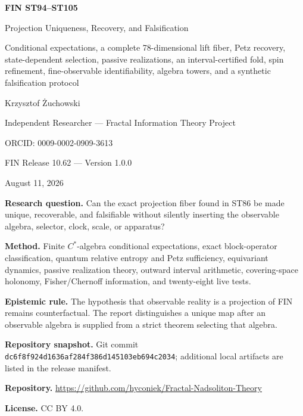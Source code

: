 \documentclass[11pt,a4paper]{article}
\begin{document}
\begin{titlepage}
\centering
\vspace*{1.1cm}
{\LARGE\bfseries FIN ST94--ST105\par}
\vspace{0.35cm}
{\Large Projection Uniqueness, Recovery, and Falsification\par}
\vspace{0.42cm}
{\large Conditional expectations, a complete 78-dimensional lift fiber, Petz recovery, state-dependent selection, passive realizations, an interval-certified fold, spin refinement, fine-observable identifiability, algebra towers, and a synthetic falsification protocol\par}
\vspace{0.95cm}
{\Large Krzysztof Żuchowski\par}
\vspace{0.24cm}
{\large Independent Researcher --- Fractal Information Theory Project\par}
{\large ORCID: 0009-0002-0909-3613\par}
\vspace{0.75cm}
{\large FIN Release 10.62 --- Version 1.0.0\par}
{\large August 11, 2026\par}
\vfill
\begin{minipage}{0.90\textwidth}
\textbf{Research question.} Can the exact projection fiber found in ST86 be made unique, recoverable, and falsifiable without silently inserting the observable algebra, selector, clock, scale, or apparatus?\par
\textbf{Method.} Finite $C^*$-algebra conditional expectations, exact block-operator classification, quantum relative entropy and Petz sufficiency, equivariant dynamics, passive realization theory, outward interval arithmetic, covering-space holonomy, Fisher/Chernoff information, and twenty-eight live tests.\par
\textbf{Epistemic rule.} The hypothesis that observable reality is a projection of FIN remains counterfactual. The report distinguishes a unique map after an observable algebra is supplied from a strict theorem selecting that algebra.\par
\textbf{Repository snapshot.} Git commit \texttt{dc6f8f924d1636af284f386d145103eb694c2034}; additional local artifacts are listed in the release manifest.\par
\textbf{Repository.} \url{https://github.com/hyconiek/Fractal-Nadsoliton-Theory}\par
\textbf{License.} CC BY 4.0.
\end{minipage}
\end{titlepage}
\end{document}
